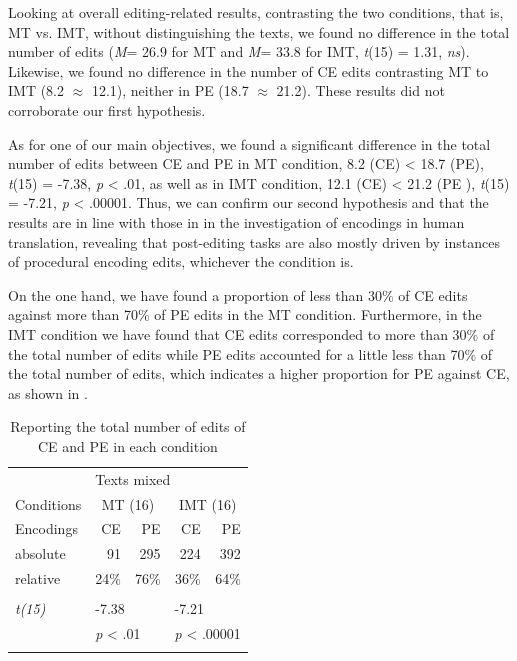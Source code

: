 \documentclass[output=paper]{langsci/langscibook}
\begin{document}
Looking at overall editing-related results, contrasting the two conditions, that is,  MT vs. IMT, without distinguishing the texts, we found no difference in the total number of edits (\textit{M}= 26.9 for MT and \textit{M}= 33.8 for IMT, \textit{t}(15) = 1.31, \textit{ns}). Likewise, we found no difference in the number of CE edits contrasting MT to IMT (8.2 ${\approx}$ 12.1), neither in PE (18.7 ${\approx}$ 21.2). These results did not corroborate our first hypothesis. 



As for one of our main objectives, we found a significant difference in the total number of edits between CE and PE in MT condition, 8.2 (CE) {\textless} 18.7 (PE),               \textit{t}(15) = -7.38, \textit{p} {\textless} .01, as well as in IMT condition, 12.1 (CE) {\textless} 21.2 (PE ), \textit{t}(15) = -7.21,     \textit{p} {\textless} .00001. Thus, we can confirm our second hypothesis and that the results are in line with those in \citet{alves2013} in the investigation of encodings in human translation, revealing that post-editing tasks are also mostly driven by instances of procedural encoding edits, whichever the condition is.




On the one hand, we have found a proportion of less than 30\% of CE edits against more than 70\% of PE edits in the MT condition. Furthermore, in the IMT condition we have found that CE edits corresponded to more than 30\% of the total number of edits while PE edits accounted for a little less than 70\% of the total number of edits, which indicates a higher proportion for PE against CE, as shown in . 

\begin{table}
\begin{tabular}{lrrrr}
\lsptoprule
~ & \multicolumn{4}{l}{Texts mixed}\\
Conditions & \multicolumn{2}{c}{MT (16)} & \multicolumn{2}{c}{IMT (16)}\\
Encodings & {CE } & PE & {CE } & PE\\
\midrule
absolute & {91} & 295 & {224} & 392\\
relative & {24\%} & 76\% & {36\%} & 64\%\\\\
\textit{t(15)} & \multicolumn{2}{l}{-7.38} & \multicolumn{2}{l}{-7.21}\\
~ & \multicolumn{2}{l}{\textit{p} {\textless} .01} & \multicolumn{2}{l}{\textit{p} {\textless} .00001}\\
\lspbottomrule
\end{tabular}
\caption{Reporting the total number of edits of CE and PE in each condition}
\label{sarto:tab:3}
\end{table}
\end{document}
